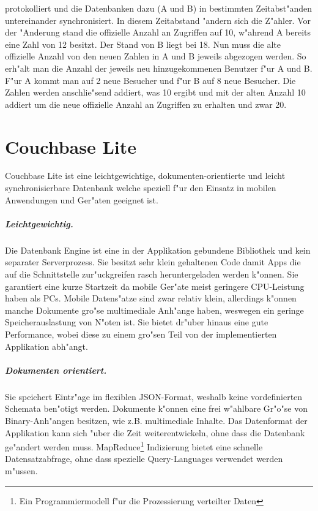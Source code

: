 \documentclass[a4paper,14pt]{scrreprt}
\begin{document}
protokolliert und die Datenbanken dazu (A und B) in bestimmten Zeitabst"anden untereinander synchronisiert. In diesem Zeitabstand "andern sich die Z"ahler. Vor der "Anderung stand die offizielle Anzahl an Zugriffen auf 10, w"ahrend A bereits eine Zahl von 12 besitzt. Der Stand von B liegt bei 18. Nun muss die alte offizielle Anzahl von den neuen Zahlen in A und B jeweils abgezogen werden. So erh"alt man die Anzahl der jeweils neu hinzugekommenen Benutzer f"ur A und B. F"ur A kommt man auf 2 neue Besucher und f"ur B auf 8 neue Besucher. Die Zahlen werden anschlie"send addiert, was 10 ergibt und mit der alten Anzahl 10 addiert um die neue offizielle Anzahl an Zugriffen zu erhalten und zwar 20.\cite{ausWo}
 
\chapter{Couchbase Lite}
Couchbase Lite ist eine leichtgewichtige, dokumenten-orientierte und leicht synchronisierbare Datenbank welche speziell f"ur den Einsatz in mobilen Anwendungen und Ger"aten geeignet ist.
\paragraph{Leichtgewichtig.}
Die Datenbank Engine ist eine in der Applikation gebundene Bibliothek und kein separater Serverprozess. Sie besitzt sehr klein gehaltenen Code damit Apps die auf die Schnittstelle zur"uckgreifen rasch heruntergeladen werden k"onnen. Sie garantiert eine kurze Startzeit da mobile Ger"ate meist geringere CPU-Leistung haben als PCs. Mobile Datens"atze sind zwar relativ klein, allerdings k"onnen manche Dokumente gro"se multimediale Anh"ange haben, weswegen ein geringe Speicherauslastung von N"oten ist. Sie bietet dr"uber hinaus eine gute Performance, wobei diese zu einem gro"sen Teil von der implementierten Applikation abh"angt.

\paragraph{Dokumenten orientiert.}
Sie speichert Eintr"age im flexiblen JSON-Format, weshalb keine vordefinierten Schemata ben"otigt werden. Dokumente k"onnen eine frei w"ahlbare Gr"o"se von Binary-Anh"angen besitzen, wie z.B. multimediale Inhalte. Das Datenformat der Applikation kann sich "uber die Zeit weiterentwickeln, ohne dass die Datenbank ge"andert werden muss. MapReduce\footnote[1]{Ein Programmiermodell f"ur die Prozessierung verteilter Daten} Indizierung bietet eine schnelle Datensatzabfrage, ohne dass spezielle Query-Languages verwendet werden m"ussen.
\end{document}
